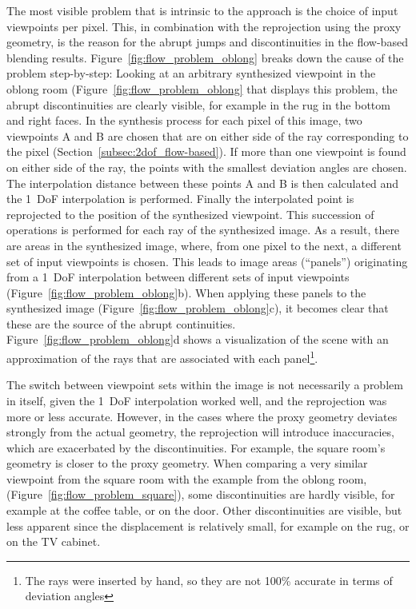 The most visible problem that is intrinsic to the approach is the choice of input viewpoints per pixel. This, in combination with the reprojection using the proxy geometry, is the reason for the abrupt jumps and discontinuities in the flow-based blending results. Figure~\ref{fig:flow_problem_oblong} breaks down the cause of the problem step-by-step: Looking at an arbitrary synthesized viewpoint in the oblong room (Figure~\ref{fig:flow_problem_oblong} that displays this problem, the abrupt discontinuities are clearly visible, for example in the rug in the bottom and right faces. 
In the synthesis process for each pixel of this image, two viewpoints A and B are chosen that are on either side of the ray corresponding to the pixel (Section~\ref{subsec:2dof_flow-based}). If more than one viewpoint is found on either side of the ray, the points with the smallest deviation angles are chosen. The interpolation distance between these points A and B is then calculated and the 1~DoF interpolation is performed. Finally the interpolated point is reprojected to the position of the synthesized viewpoint.
This succession of operations is performed for each ray of the synthesized image. As a result, there are areas in the synthesized image, where, from one pixel to the next, a different set of input viewpoints is chosen. This leads to image areas (``panels'') originating from a 1~DoF interpolation between different sets of input viewpoints (Figure~\ref{fig:flow_problem_oblong}b). When applying these panels to the synthesized image (Figure~\ref{fig:flow_problem_oblong}c), it becomes clear that these are the source of the abrupt continuities.
Figure~\ref{fig:flow_problem_oblong}d shows a visualization of the scene with an approximation of the rays that are associated with each panel\footnote{The rays were inserted by hand, so they are not 100\% accurate in terms of deviation angles}.

The switch between viewpoint sets within the image is not necessarily a problem in itself, given the 1~DoF interpolation worked well, and the reprojection was more or less accurate. However, in the cases where the proxy geometry deviates strongly from the actual geometry, the reprojection will introduce inaccuracies, which are exacerbated by the discontinuities.
For example, the square room's geometry is closer to the proxy geometry. When comparing a very similar viewpoint from the square room with the example from the oblong room, (Figure~\ref{fig:flow_problem_square}), some discontinuities are hardly visible, for example at the coffee table, or on the door. Other discontinuities are visible, but less apparent since the displacement is relatively small, for example on the rug, or on the TV cabinet.

